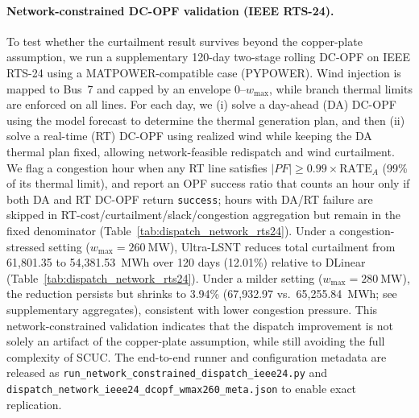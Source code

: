 \documentclass[review,3p,times]{elsarticle}
\begin{document}
\paragraph{Network-constrained DC-OPF validation (IEEE RTS-24).}\label{subsec:disc_dispatch_network}
To test whether the curtailment result survives beyond the copper-plate assumption, we run a supplementary 120-day two-stage rolling DC-OPF on IEEE RTS-24 using a MATPOWER-compatible case (PYPOWER). Wind injection is mapped to Bus~7 and capped by an envelope $0\text{--}w_{\max}$, while branch thermal limits are enforced on all lines. For each day, we (i) solve a day-ahead (DA) DC-OPF using the model forecast to determine the thermal generation plan, and then (ii) solve a real-time (RT) DC-OPF using realized wind while keeping the DA thermal plan fixed, allowing network-feasible redispatch and wind curtailment. We flag a congestion hour when any RT line satisfies $|PF| \ge 0.99\times \text{RATE}_A$ (99\% of its thermal limit), and report an OPF success ratio that counts an hour only if both DA and RT DC-OPF return \texttt{success}; hours with DA/RT failure are skipped in RT-cost/curtailment/slack/congestion aggregation but remain in the fixed denominator (Table~\ref{tab:dispatch_network_rts24}). Under a congestion-stressed setting ($w_{\max}=260~\mathrm{MW}$), Ultra-LSNT reduces total curtailment from 61,801.35 to 54,381.53~MWh over 120 days (12.01\%) relative to DLinear (Table~\ref{tab:dispatch_network_rts24}). Under a milder setting ($w_{\max}=280~\mathrm{MW}$), the reduction persists but shrinks to 3.94\% (67,932.97 vs.\ 65,255.84~MWh; see supplementary aggregates), consistent with lower congestion pressure. This network-constrained validation indicates that the dispatch improvement is not solely an artifact of the copper-plate assumption, while still avoiding the full complexity of SCUC. The end-to-end runner and configuration metadata are released as \texttt{run\_network\_constrained\_dispatch\_ieee24.py} and \texttt{dispatch\_network\_ieee24\_dcopf\_wmax260\_meta.json} to enable exact replication.
\end{document}
